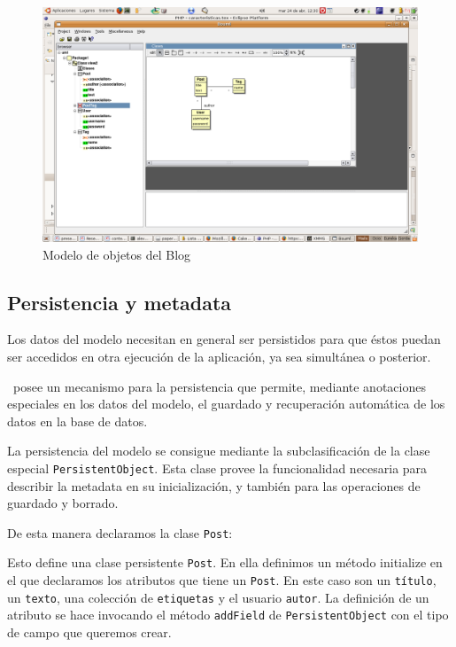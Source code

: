 \begin{figure}[ht]
	\centering
	\includegraphics*[scale=0.50,viewport=420 350 700 600]{images/diagrama.png}
 	\caption{Modelo de objetos del Blog}
 	\label{fig-model1}
\end{figure}


\subsection{Persistencia y metadata}
\label{sub-pers}

Los datos del modelo necesitan en general ser persistidos para que éstos puedan ser accedidos en otra ejecución de la aplicación, ya sea simultánea o posterior.

\PWB \ posee un mecanismo para la persistencia que permite, mediante anotaciones especiales en los datos del modelo, el guardado y recuperación automática de los datos en la base de datos.

La persistencia del modelo se consigue mediante la subclasificación de la clase especial \verb"PersistentObject". Esta clase provee la funcionalidad necesaria para describir la metadata en su inicialización, y también para las operaciones de guardado y borrado.

De esta manera declaramos la clase \verb"Post":

\begin{lgrind}

\end{lgrind}

Esto define una clase persistente \verb"Post". En ella definimos un método initialize en el que declaramos los atributos que tiene un \verb"Post". En este caso son un \verb"título", un \verb"texto", una colección de \verb"etiquetas" y el usuario \verb"autor". La definición de un atributo se hace invocando el método \verb"addField" de \verb"PersistentObject" con el tipo de campo que queremos crear.

